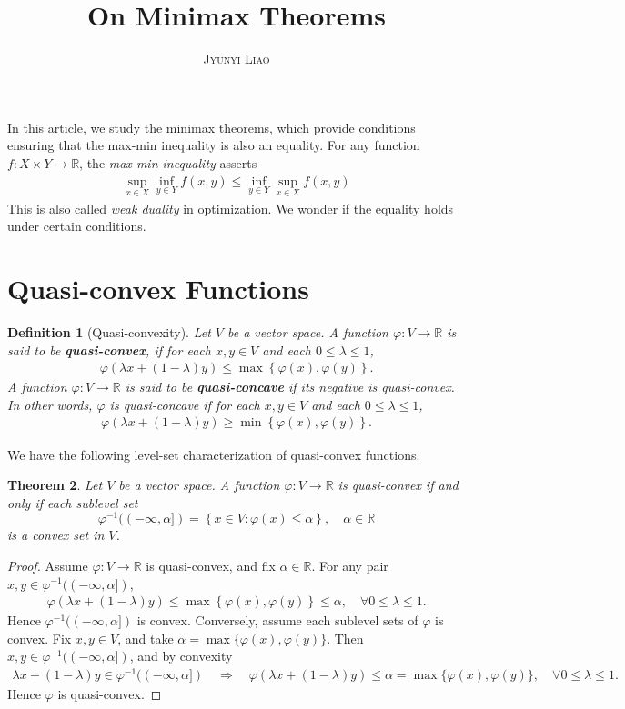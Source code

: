 \documentclass{article}
\title{\bf On Minimax Theorems}
\author{\textsc{Jyunyi Liao}}
\date{}
\numberwithin{equation}{section}
\newcommand{\bbR}{\mathbb{R}}
\newtheorem{theorem}{Theorem}
\newtheorem{definition}[theorem]{Definition}
\begin{document}
\maketitle
In this article, we study the minimax theorems, which provide conditions ensuring that the max-min inequality is also an equality. For any function $f:X\times Y\to\bbR$, the \textit{max-min inequality} asserts
\begin{align*}
	\sup_{x\in X}\inf_{y\in Y} f(x,y)\leq\inf_{y\in Y}\sup_{x\in X} f(x,y)
\end{align*}
This is also called \textit{weak duality} in optimization. We wonder if the equality holds under certain conditions.

\section{Quasi-convex Functions}
\begin{definition}[Quasi-convexity]
Let $V$ be a vector space. A function $\varphi:V\to\bbR$ is said to be \textbf{quasi-convex}, if for each $x,y\in V$ and each $0\leq\lambda\leq 1$,
\begin{align*}
	\varphi(\lambda x+(1-\lambda)y)\leq\max\left\{\varphi(x),\varphi(y)\right\}.
\end{align*}
A function $\varphi:V\to\bbR$ is said to be \textbf{quasi-concave} if its negative is quasi-convex. In other words, $\varphi$ is quasi-concave if for each $x,y\in V$ and each $0\leq\lambda\leq 1$,
\begin{align*}
	\varphi(\lambda x+(1-\lambda)y)\geq\min\left\{\varphi(x),\varphi(y)\right\}.
\end{align*}
\end{definition}
We have the following level-set characterization of quasi-convex functions.
\begin{theorem}
Let $V$ be a vector space. A function $\varphi:V\to\bbR$ is quasi-convex if and only if each sublevel set $$\varphi^{-1}((-\infty,\alpha])=\left\{x\in V:\varphi(x)\leq\alpha\right\},\quad\alpha\in\bbR$$ is a convex set in $V$.
\end{theorem}
\begin{proof}
Assume $\varphi:V\to\bbR$ is quasi-convex, and fix $\alpha\in\bbR$. For any pair $x,y\in\varphi^{-1}((-\infty,\alpha])$, 
\begin{align*}
	\varphi(\lambda x+(1-\lambda)y)\leq\max\left\{\varphi(x),\varphi(y)\right\}\leq\alpha,\quad\forall 0\leq\lambda\leq 1.
\end{align*}
Hence $\varphi^{-1}((-\infty,\alpha])$ is convex. Conversely, assume each sublevel sets of $\varphi$ is convex. Fix $x,y\in V$, and take $\alpha=\max\{\varphi(x),\varphi(y)\}$. Then $x,y\in\varphi^{-1}((-\infty,\alpha])$, and by convexity
\begin{align*}
	\lambda x+(1-\lambda)y\in\varphi^{-1}((-\infty,\alpha])\quad\Rightarrow\quad \varphi(\lambda x+(1-\lambda)y)\leq\alpha=\max\{\varphi(x),\varphi(y)\},\quad\forall 0\leq\lambda\leq 1.
\end{align*}
Hence $\varphi$ is quasi-convex.
\end{proof}
\end{document}
